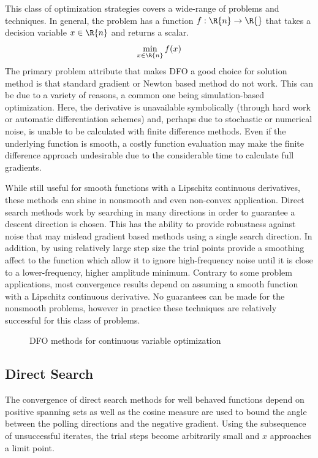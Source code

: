This class of optimization strategies covers a wide-range of problems and techniques.  In general, the problem has a function $f: \R{n} \rightarrow \R{}$ that takes a decision variable $x \in \R{n}$ and returns a scalar. 
\begin{equation}
\min_{x \in \R{n}} f(x)
\end{equation}
The primary problem attribute that makes DFO a good choice for solution method is that standard gradient or Newton based method do not work.  This can be due to a variety of reasons, a common one being simulation-based optimization.  Here, the derivative is unavailable symbolically (through hard work or automatic differentiation schemes) and, perhaps due to stochastic or numerical noise, is unable to be calculated with finite difference methods.  Even if the underlying function is smooth, a costly function evaluation may make the finite difference approach undesirable due to the considerable time to calculate full gradients.

While still useful for smooth functions with a Lipschitz continuous derivatives, these methods can shine in nonsmooth and even non-convex application.  Direct search methods work by searching in many directions in order to guarantee a descent direction is chosen.  This has the ability to provide robustness against noise that may mislead gradient based methods using a single search direction.  In addition, by using relatively large step size the trial points provide a smoothing affect to the function which allow it to ignore high-frequency noise until it is close to a lower-frequency, higher amplitude minimum.  Contrary to some problem applications, most convergence results depend on assuming a smooth function with a Lipschitz continuous derivative.  No guarantees can be made for the nonsmooth problems, however in practice these techniques are relatively successful for this class of problems.

\begin{figure}
\centering

\caption{DFO methods for continuous variable optimization}
\end{figure}

\subsection{Direct Search}
The convergence of direct search methods for well behaved functions depend on positive spanning sets as well as the cosine measure are used to bound the angle between the polling directions and the negative gradient.  Using the subsequence of unsuccessful iterates, the trial steps become arbitrarily small and $x$ approaches a limit point.

